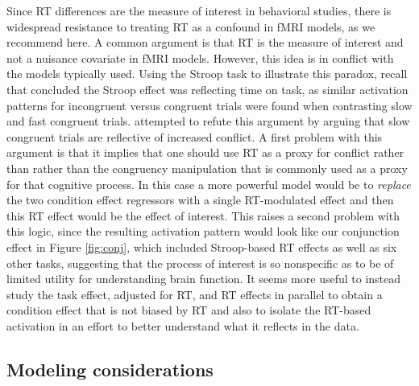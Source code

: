 \documentclass[titlepage,12pt] {article}
\begin{document}
Since RT differences are the measure of interest in behavioral studies, there is widespread resistance to treating RT as a confound in fMRI models, as we recommend here.  A common argument is that RT is the measure of interest and not a nuisance covariate in fMRI models.  However, this idea is in conflict with the models typically used.  Using the Stroop task to illustrate this paradox, recall that \citet{grinband_dorsal_2011} concluded the Stroop effect was reflecting time on task, as similar activation patterns for incongruent versus congruent trials were found when contrasting slow and fast congruent trials.  \citet{yeung_errors_2011} attempted to refute this argument by arguing that slow congruent trials are reflective of increased conflict.  A first problem with this argument is that it implies that one should use RT as a proxy for conflict rather than rather than the congruency manipulation that is commonly used as a proxy for that cognitive process.   In this case a more powerful model would be to \emph{replace} the two condition effect regressors  with a single RT-modulated effect and then this RT effect would be the effect of interest.  This raises a second problem with this logic, since the resulting activation pattern would look like our conjunction effect in Figure \ref{fig:conj}, which included Stroop-based RT effects as well as six other tasks, suggesting that the process of interest is so nonspecific as to be of limited utility for understanding brain function.   It seems more useful to instead study the task effect, adjusted for RT, and RT effects in parallel to obtain a condition effect that is not biased by RT and also to isolate the RT-based activation in an effort to better understand what it reflects in the data. 

\subsection*{Modeling considerations}
\end{document}
